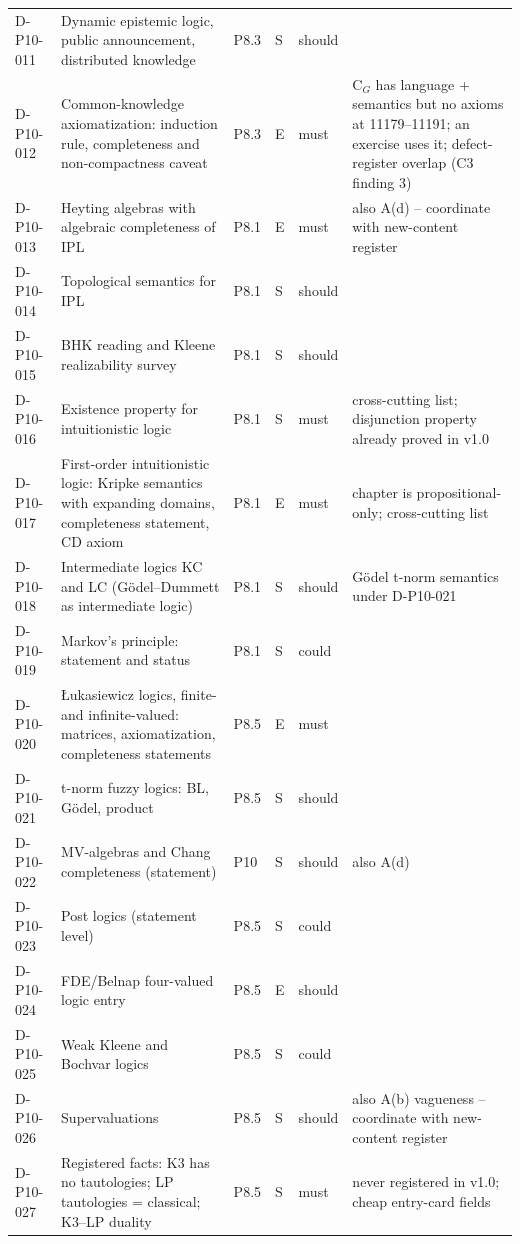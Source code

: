 \begin{longtable}{@{}p{0.62in}p{2.6in}p{0.75in}p{0.22in}p{0.42in}p{1.85in}@{}}
D-P10-011 & Dynamic epistemic logic, public announcement, distributed knowledge & P8.3 & S & should &  \\
D-P10-012 & Common-knowledge axiomatization: induction rule, completeness and non-compactness caveat & P8.3 & E & must & C\(_G\) has language + semantics but no axioms at 11179--11191; an exercise uses it; defect-register overlap (C3 finding 3) \\
D-P10-013 & Heyting algebras with algebraic completeness of IPL & P8.1 & E & must & also A(d) -- coordinate with new-content register \\
D-P10-014 & Topological semantics for IPL & P8.1 & S & should &  \\
D-P10-015 & BHK reading and Kleene realizability survey & P8.1 & S & should &  \\
D-P10-016 & Existence property for intuitionistic logic & P8.1 & S & must & cross-cutting list; disjunction property already proved in v1.0 \\
D-P10-017 & First-order intuitionistic logic: Kripke semantics with expanding domains, completeness statement, CD axiom & P8.1 & E & must & chapter is propositional-only; cross-cutting list \\
D-P10-018 & Intermediate logics KC and LC (G\"odel--Dummett as intermediate logic) & P8.1 & S & should & G\"odel t-norm semantics under D-P10-021 \\
D-P10-019 & Markov's principle: statement and status & P8.1 & S & could &  \\
D-P10-020 & {\L}ukasiewicz logics, finite- and infinite-valued: matrices, axiomatization, completeness statements & P8.5 & E & must &  \\
D-P10-021 & t-norm fuzzy logics: BL, G\"odel, product & P8.5 & S & should &  \\
D-P10-022 & MV-algebras and Chang completeness (statement) & P10 & S & should & also A(d) \\
D-P10-023 & Post logics (statement level) & P8.5 & S & could &  \\
D-P10-024 & FDE/Belnap four-valued logic entry & P8.5 & E & should &  \\
D-P10-025 & Weak Kleene and Bochvar logics & P8.5 & S & could &  \\
D-P10-026 & Supervaluations & P8.5 & S & should & also A(b) vagueness -- coordinate with new-content register \\
D-P10-027 & Registered facts: K3 has no tautologies; LP tautologies = classical; K3--LP duality & P8.5 & S & must & never registered in v1.0; cheap entry-card fields \\

\end{longtable}
